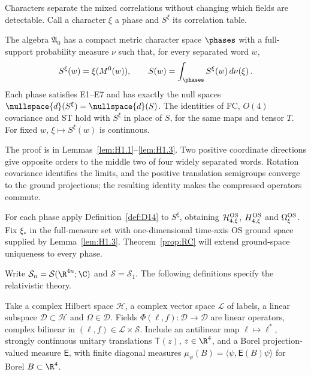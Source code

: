 Characters separate the mixed correlations without changing which fields are detectable. Call a character $\xi$ a phase and $S^\xi$ its correlation table.

\begin{theorem}\label{prop:PH}
The algebra $\mathfrak A_0$ has a compact metric character space $\phases$ with a full-support probability measure $\nu$ such that, for every separated word $w$,
\begin{equation*}
S^\xi(w)=\xi(M^0(w)),\qquad S(w)=\int_{\phases}S^\xi(w)\,d\nu(\xi)\,.
\end{equation*}
Each phase satisfies E1--E7 and has exactly the null spaces $\nullspace{d}(S^\xi)=\nullspace{d}(S)$. The identities of FC, $O(4)$ covariance and ST hold with $S^\xi$ in place of $S$, for the same maps and tensor $T$. For fixed $w$, $\xi\mapsto S^\xi(w)$ is continuous.
\end{theorem}

The proof is in Lemmas~\ref{lem:H1.1}--\ref{lem:H1.3}. Two positive coordinate directions give opposite orders to the middle two of four widely separated words. Rotation covariance identifies the limits, and the positive translation semigroups converge to the ground projections; the resulting identity makes the compressed operators commute.

For each phase apply Definition~\ref{def:D14} to $S^\xi$, obtaining $\mathcal H_{4,\xi}^{\rm OS}$, $H_{4,\xi}^{\rm OS}$ and $\Omega_\xi^{\rm OS}$. Fix $\xi_*$ in the full-measure set with one-dimensional time-axis OS ground space supplied by Lemma~\ref{lem:H1.3}. Theorem~\ref{prop:RC} will extend ground-space uniqueness to every phase.

Write $\mathcal S_n=\mathcal S(\R^{4n};\C)$ and $\mathcal S=\mathcal S_1$. The following definitions specify the relativistic theory.

\begin{definition}\label{def:D14a}
Take a complex Hilbert space $\mathcal H$, a complex vector space $\mathcal L$ of labels, a linear subspace $\mathcal D\subset\mathcal H$ and $\Omega\in\mathcal D$. Fields $\Phi(\ell,f):\mathcal D\to\mathcal D$ are linear operators, complex bilinear in $(\ell,f)\in\mathcal L\times\mathcal S$. Include an antilinear map $\ell\mapsto\ell^*$, strongly continuous unitary translations $\mathsf T(z)$, $z\in\R^4$, and a Borel projection-valued measure $\mathsf E$, with finite diagonal measures $\mu_\psi(B)=\langle\psi,\mathsf E(B)\psi\rangle$ for Borel $B\subset\R^4$.
\end{definition}

